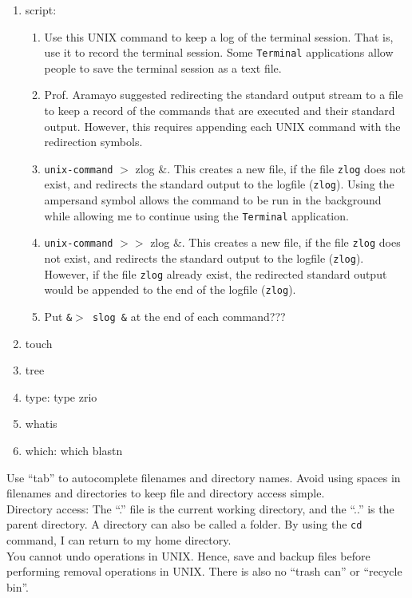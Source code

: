 \begin{enumerate}
\begin{enumerate}
	\end{enumerate}
\item script: \vspace{-0.3cm}
	\begin{enumerate} \itemsep -2pt
	\item Use this UNIX command to keep a log of the terminal session. That is, use it to record the terminal session. Some {\tt Terminal} applications allow people to save the terminal session as a text file.
	\item Prof. Aramayo suggested redirecting the standard output stream to a file to keep a record of the commands that are executed and their standard output. However, this requires appending each UNIX command with the redirection symbols.
	\item {\tt unix-command} $>$ zlog \&. This creates a new file, if the file {\tt zlog} does not exist, and redirects the standard output to the logfile ({\tt zlog}). Using the ampersand symbol allows the command to be run in the background while allowing me to continue using the {\tt Terminal} application.
	\item {\tt unix-command} $>>$ zlog \&. This creates a new file, if the file {\tt zlog} does not exist, and redirects the standard output to the logfile ({\tt zlog}). However, if the file {\tt zlog} already exist, the redirected standard output would be appended to the end of the logfile ({\tt zlog}).
	\item Put {\tt \&$>$ slog \&} at the end of each command???
	\end{enumerate}
\item touch
\item tree
\item type: type zrio
\item whatis
\item which: which blastn
\end{enumerate}


Use ``tab'' to autocomplete filenames and directory names. Avoid using spaces in filenames and directories to keep file and directory access simple. \\

Directory access: The ``.'' file is the current working directory, and the ``..'' is the parent directory. A directory can also be called a folder. By using the {\tt cd} command, I can return to my home directory. \\

You cannot undo operations in UNIX. Hence, save and backup files before performing removal operations in UNIX. There is also no ``trash can'' or ``recycle bin''. \\

